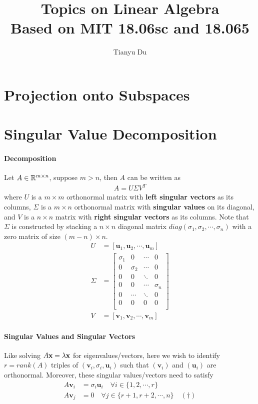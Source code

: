 \documentclass[11pt]{article}
\title{Topics on Linear Algebra \\ \small Based on MIT 18.06sc and 18.065}
\author{Tianyu Du}
\begin{document}
	\maketitle
	\section{Projection onto Subspaces}
	\section{Singular Value Decomposition}
	\paragraph{Decomposition}
	Let $A \in \mathbb{R}^{m \times n}$, suppose $m > n$, then $A$ can be written as
		\begin{align}
			A = U \Sigma V^T
		\end{align}
	where $U$ is a $m \times m$ orthonormal matrix with \textbf{left singular vectors} as its columns,
	$\Sigma$ is a $m \times n$ orthonormal matrix with \textbf{singular values} on its diagonal, and $V$ is a $n \times n$ matrix with \textbf{right singular vectors} as its columns.
	Note that $\Sigma$ is constructed by stacking a $n \times n$ diagonal matrix $diag(\sigma_1, \sigma_2, \cdots, \sigma_n)$ with a zero matrix of size $(m-n) \times n$.
	\begin{align}
		U &= [\mathbf{u}_1 , \mathbf{u}_2 ,\cdots , \mathbf{u}_m] \\
		\Sigma &= \begin{bmatrix}
			\sigma_1 & 0 & \cdots & 0 \\
			0 & \sigma_2 & \cdots & 0 \\
			0 & 0 & \ddots & 0 \\
			0 & 0 & \cdots & \sigma_n \\
			0 & \cdots & \ddots & 0 \\
			0 & 0 & 0 & 0 \\
		\end{bmatrix} \\
		V &= [\mathbf{v}_1 , \mathbf{v}_2 , \cdots , \mathbf{v}_m]
	\end{align}
	\paragraph{Singular Values and Singular Vectors} Like solving $A \textbf{x} = \lambda \textbf{x}$ for eigenvalues/vectors, here we wish to identify $r = rank(A)$ triples of $(\mathbf{v}_i, \sigma_i, \mathbf{u}_i)$ such that $(\mathbf{v}_i)$ and $(\mathbf{u}_i)$ are orthonormal.
	Moreover, these singular values/vectors need to satisfy
	\begin{align}
		A \mathbf{v}_i &= \sigma_i \mathbf{u}_i\quad \forall i \in \{1, 2, \cdots, r\} \\
		A \mathbf{v}_j &= 0\quad \forall j \in \{r+1, r+2, \cdots, n\}\quad (\dagger)
	\end{align}
\end{document}

